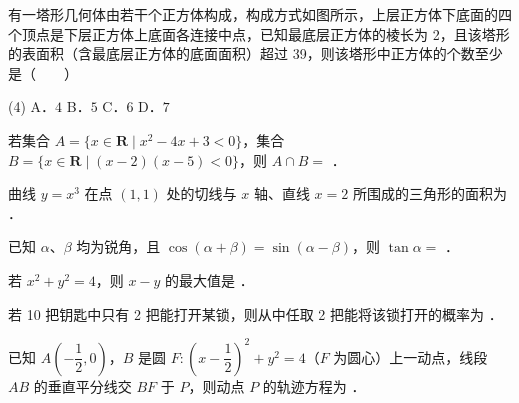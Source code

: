 \begin{question}
有一塔形几何体由若干个正方体构成，构成方式如图所示，上层正方体下底面的四个顶点是下层正方体上底面各连接中点，已知最底层正方体的棱长为 2，且该塔形的表面积（含最底层正方体的底面面积）超过 39，则该塔形中正方体的个数至少是\mbox{（　　）}
\nopagebreak[4]
\begin{center}\end{center}
\nopagebreak[4]
\begin{gkopts}(4)
\task A．$4$
\task B．$5$
\task C．$6$
\task D．$7$
\end{gkopts}

\end{question}

\begin{question}
若集合 $A = \{x \in \mathbf{R} \mid x^2 - 4x + 3 < 0\}$，集合 $B = \{x \in \mathbf{R} \mid (x - 2)(x - 5) < 0\}$，则 $A \cap B =$ \underline{\hspace{2cm}}．

\end{question}
\begin{question}
曲线 $y = x^3$ 在点 $(1, 1)$ 处的切线与 $x$ 轴、直线 $x = 2$ 所围成的三角形的面积为 \underline{\hspace{2cm}}．

\end{question}
\begin{question}
已知 $\alpha$、$\beta$ 均为锐角，且 $\cos(\alpha + \beta) = \sin(\alpha - \beta)$，则 $\tan\alpha =$ \underline{\hspace{2cm}}．

\end{question}
\begin{question}
若 $x^2 + y^2 = 4$，则 $x - y$ 的最大值是 \underline{\hspace{2cm}}．

\end{question}
\begin{question}
若 10 把钥匙中只有 2 把能打开某锁，则从中任取 2 把能将该锁打开的概率为 \underline{\hspace{2cm}}．

\end{question}
\begin{question}
已知 $A\left(-\dfrac{1}{2}, 0\right)$，$B$ 是圆 $F: \left(x - \dfrac{1}{2}\right)^2 + y^2 = 4$（$F$ 为圆心）上一动点，线段 $AB$ 的垂直平分线交 $BF$ 于 $P$，则动点 $P$ 的轨迹方程为 \underline{\hspace{2cm}}．

\end{question}

